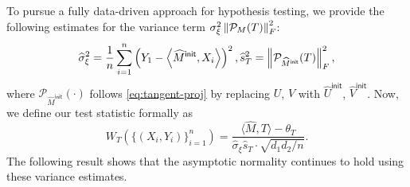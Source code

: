 \documentclass[12pt]{article}
\newcommand{\tF}{{\rm F}}
\newcommand{\norm}[1]{\left\lVert#1\right\rVert}
\newcommand{\PP}{\mathbb{P}}
\newcommand{\E}{\mathbb{E}}
\newcommand{\cP}{\mathcal{P}}
\newcommand{\cN}{\mathcal{N}}
\def\calM{{\mathcal M}}
\def\BB{{\mathbb B}}
\def\PP{{\mathbb P}}
\def\TT{{\mathbb T}}
\newcommand{\idc}{\mathbb{I}}
\newcommand{\gap}{{\mathsf{gap} }}
\newcommand{\SNR}{{\mathsf{SNR}}}
\newcommand{\opt}{{\mathsf{opt}}}
\newcommand{\dmax}{\bar{d}}
\newtheorem{Theorem}{Theorem}
\theoremstyle{plain}
\begin{document}
\begin{sloppypar}
{To pursue a fully data-driven approach for hypothesis testing, we provide the following estimates for the variance term $\sigma_\xi^2\norm{\cP_M(T)}_{\tF}^2$:
\begin{equation*}
    \widehat{\sigma}^2_{\xi}=\frac{1}{n}\sum_{i=1}^n\left(Y_1-\left\langle \widehat{M}^{\mathsf{init}},X_i\right\rangle\right)^2, \widehat{s}_T^2= \norm{\cP_{\widehat{M}^{\mathsf{init}}} (T)}_{\tF}^2,
\end{equation*}
where $\cP_{\widehat{M}^{\mathsf{init}}}(\cdot)$ follows \eqref{eq:tangent-proj} by replacing $U$, $V$ with $\widehat{U}^{\mathsf{init}}$, $\widehat{V}^{\mathsf{init}}$.
Now, we define our test statistic formally as  
\begin{equation}\label{eq:WT-def}
    W_T\left(\{(X_i,Y_i)\}_{i=1}^n\right) = \frac{\langle \widehat{M}, T\rangle-\theta_T}{\widehat{\sigma}_{\xi} \widehat{s}_T \cdot \sqrt{d_1 d_2 / n}}. 
\end{equation}
The following result shows that the asymptotic normality continues to hold using these variance estimates.








}
\end{sloppypar}
\end{document}
